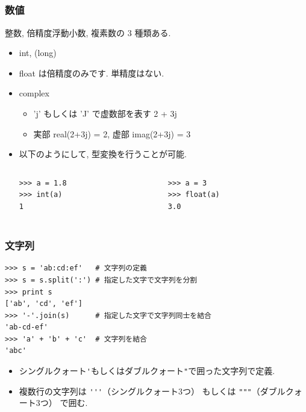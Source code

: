 \subsection*{\redm\whiteb\greenb}
\begin{frame}[t,fragile]
\frametitle{数値}
整数, 倍精度浮動小数, 複素数の 3 種類ある. 

\begin{itemize}
 \item int, (long)
 \item float は倍精度のみです. 単精度はない. 
 \item complex
       \begin{itemize}
	\item 'j' もしくは 'J' で虚数部を表す 2 + 3j
	\item 実部 real(2+3j) = 2, 虚部 imag(2+3j) = 3  
       \end{itemize}
 \item 以下のようにして, 型変換を行うことが可能. 

       \begin{columns}
	\begin{column}{4cm}
\begin{lstlisting}
>>> a = 1.8
>>> int(a)
1
\end{lstlisting}	 
	\end{column}
	\begin{column}{4cm}
\begin{lstlisting}
>>> a = 3
>>> float(a)
3.0
\end{lstlisting}	 
	\end{column}
       \end{columns}
\end{itemize}
\end{frame}

\subsection*{\redm\whiteb\greenb}
\begin{frame}[t,fragile]
\frametitle{文字列}
\begin{lstlisting}
>>> s = 'ab:cd:ef'   # 文字列の定義
>>> s = s.split(':') # 指定した文字で文字列を分割
>>> print s
['ab', 'cd', 'ef']
>>> '-'.join(s)      # 指定した文字で文字列同士を結合
'ab-cd-ef'
>>> 'a' + 'b' + 'c'  # 文字列を結合
'abc'
\end{lstlisting}

\begin{itemize}
  \item シングルクォート\verb|'|もしくはダブルクォート\verb|"|で囲った文字列で定義. 
  \item 複数行の文字列は \verb|'''|（シングルクォート3つ） もしくは \verb|"""|（ダブルクォート3つ） で囲む.
\end{itemize}
\end{frame}

